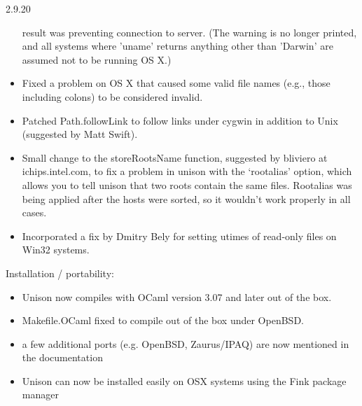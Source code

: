 \begin{changesfromversion}{2.9.20}
\begin{itemize}
  result was preventing connection to server.  (The warning is no longer
  printed, and all systems where 'uname' returns anything other than 'Darwin'
  are assumed not to be running OS X.)
\item Fixed a problem on OS X that caused some valid file names (e.g.,
  those including colons) to be considered invalid.
\item Patched Path.followLink to follow links under cygwin in addition to Unix
  (suggested by Matt Swift).
\item Small change to the storeRootsName function, suggested by bliviero at
  ichips.intel.com, to fix a problem in unison with the `rootalias'
  option, which allows you to tell unison that two roots contain the same
  files.  Rootalias was being applied after the hosts were
  sorted, so it wouldn't work properly in all cases.
\item Incorporated a fix by Dmitry Bely for setting utimes of read-only files
  on Win32 systems.
\end{itemize}
\item Installation / portability:
\begin{itemize}
\item Unison now compiles with OCaml version 3.07 and later out of the box.
\item Makefile.OCaml fixed to compile out of the box under OpenBSD.
\item a few additional ports (e.g. OpenBSD, Zaurus/IPAQ) are now mentioned in
  the documentation
\item Unison can now be installed easily on OSX systems using the Fink
  package manager
\end{itemize}
\end{changesfromversion}

